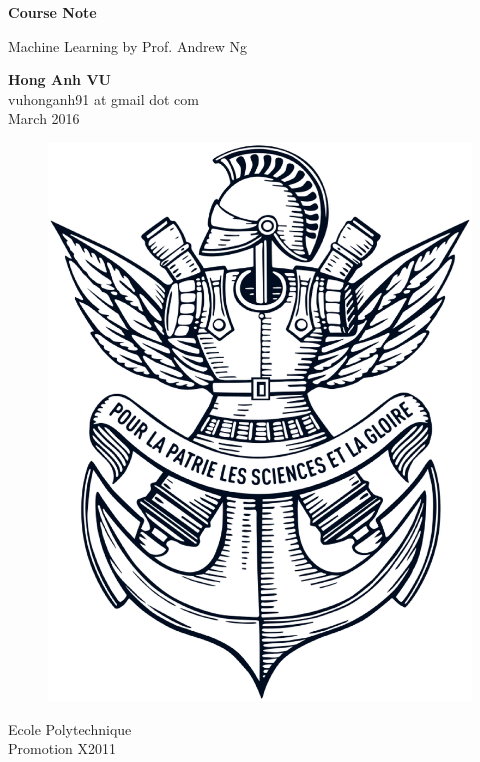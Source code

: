 \documentclass[12pt,twoside,a4paper]{report}
\begin{document}
\begin{titlepage}
    \begin{center}
        
        \Huge
        \textbf{Course Note}
        
        \vspace{0.5cm}
        \LARGE
        Machine Learning by Prof. Andrew Ng
        
        \vspace{1.5cm}
        
        \textbf{Hong Anh VU}\\
        vuhonganh91 at gmail dot com\\
        March 2016
        
        \vfill        

        \begin{figure}[!ht]
          \centering
          \includegraphics[scale=0.28]{xLogo.eps}
        \end{figure}
        
        \Large
        Ecole Polytechnique\\
        Promotion X2011\\
        
    \end{center}
\end{titlepage}


\end{document}
